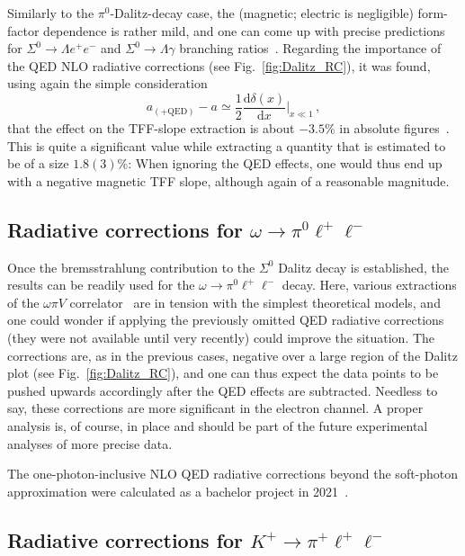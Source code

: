 Similarly to the $\pi^0$-Dalitz-decay case, the (magnetic; electric is negligible) form-factor dependence is rather mild, and one can come up with precise predictions for $\Sigma^0\to\Lambda e^+e^-$ and $\Sigma^0\to\Lambda\gamma$ branching ratios~\cite{Husek:2019wmt}.
Regarding the importance of the QED NLO radiative corrections (see Fig.~\ref{fig:Dalitz_RC}), it was found, using again the simple consideration
%
\begin{equation}
    a_{(+\text{QED})}-a
    \simeq\frac12\frac{\mathrm{d}\delta(x)}{\mathrm{d}x}\bigg|_{x\ll1}\,,
\label{eq:aQED}
\end{equation}
%
that the effect on the TFF-slope extraction is about $-3.5\%$ in absolute figures~\cite{Husek:2019wmt}.
This is quite a significant value while extracting a quantity that is estimated to be of a size $1.8(3)$\%: When ignoring the QED effects, one would thus end up with a negative magnetic TFF slope, although again of a reasonable magnitude.


\subsection[\texorpdfstring{$\omega\to\pi^0 \ell^+\ell^-$}{omega->pi0ll}]{Radiative corrections for \texorpdfstring{$\omega\to\pi^0 \ell^+\ell^-$}{omega->pi0ll}}

Once the bremsstrahlung contribution to the $\Sigma^0$ Dalitz decay is established, the results can be readily used for the $\omega\to\pi^0 \ell^+\ell^-$ decay.
Here, various extractions of the $\omega\pi V$ correlator~\cite{Dzhelyadin:1980tj,NA60:2009una,NA60:2016nad,Adlarson:2016hpp} are in tension with the simplest theoretical models, and one could wonder if applying the previously omitted QED radiative corrections (they were not available until very recently) could improve the situation.
The corrections are, as in the previous cases, negative over a large region of the Dalitz plot (see Fig.~\ref{fig:Dalitz_RC}), and one can thus expect the data points to be pushed upwards accordingly after the QED effects are subtracted.
Needless to say, these corrections are more significant in the electron channel.
A proper analysis is, of course, in place and should be part of the future experimental analyses of more precise data.

The one-photon-inclusive NLO QED radiative corrections beyond the soft-photon approximation were calculated as a bachelor project in 2021~\cite{Lindahl:bc_thesis}.


\subsection[\texorpdfstring{$K^+\to\pi^+\ell^+\ell^-$}{K+->pi+ll}]{Radiative corrections for \texorpdfstring{$K^+\to\pi^+\ell^+\ell^-$}{K+->pi+ll}}

